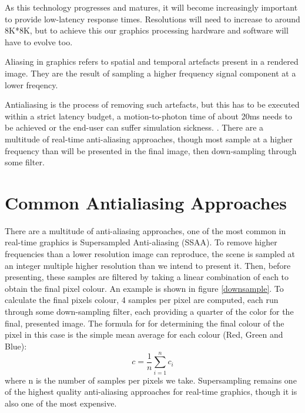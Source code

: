 \documentclass[12pt,a4paper,twoside,openright]{report}
\begin{document}
As this technology progresses and matures, it will become increasingly important to provide low-latency response times. Resolutions will need to increase to around 8K*8K, but to achieve this our graphics processing hardware and software will have to evolve too.

Aliasing in graphics refers to spatial and temporal artefacts present in a rendered image. They are the result of sampling a higher frequency signal component at a lower freqency.

Antialiasing is the process of removing such artefacts, but this has to be executed within a strict latency budget, a motion-to-photon time of about 20ms needs to be achieved or the end-user can suffer simulation sickness. \cite{MotionToPhoton}.
There are a multitude of real-time anti-aliasing approaches, though most sample at a higher frequency than will be presented in the final image, then down-sampling through some filter. 

\section{Common Antialiasing Approaches}\label{supersampling}

There are a multitude of anti-aliasing approaches, one of the most common in real-time graphics is Supersampled Anti-aliasing (SSAA). To remove higher frequencies than a lower resolution image can reproduce, the scene is sampled at an integer multiple higher resolution than we intend to present it.
Then, before presenting, these samples are filtered by taking a linear combination of each to obtain the final pixel colour. An example is shown in figure \ref{downsample}. To calculate the final pixels colour, 4 samples per pixel are computed, each run through some down-sampling filter, each providing a quarter of the color for the final, presented image. The formula for for determining the final colour of the pixel in this case is the simple mean average for each colour (Red, Green and Blue):
$$ c = \frac{1}{n}\displaystyle\sum_{i=1}^n c_i $$ where n is the number of samples per pixels we take. Supersampling remains one of the highest quality anti-aliasing approaches for real-time graphics, though it is also one of the most expensive. 
\end{document}
